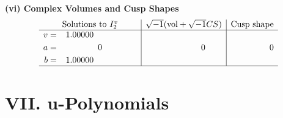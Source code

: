 \documentclass[1p]{elsarticle_modified}
\theoremstyle{definition}
\newcommand{\I}{\sqrt{-1}}
\begin{document}
\newpage\flushleft \textbf{(vi) Complex Volumes and Cusp Shapes}
$$\begin{array}{c|c|c}  
\text{Solutions to }I^v_{2}& \I (\text{vol} + \sqrt{-1}CS) & \text{Cusp shape}\\
 \hline 
\begin{aligned}
v &= \phantom{-}1.00000\phantom{ +0.000000I} \\
a &= \phantom{-0.000000 } 0 \\
b &= \phantom{-}1.00000\phantom{ +0.000000I}\end{aligned}
 & \phantom{-0.000000 } 0 & \phantom{-0.000000 } 0\\
 \hline 
 \end{array}$$\newpage
\newpage\renewcommand{\arraystretch}{1}
\centering \section*{ VII. u-Polynomials}
\end{document}
